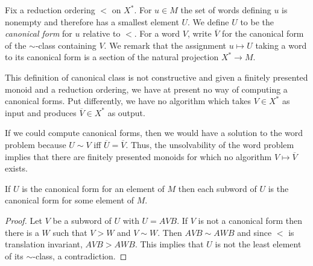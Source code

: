 \begin{defn} Fix a reduction ordering $<$ on $X^*$. For $u\in M$ the set of
    words defining $u$ is nonempty and therefore has a smallest element $U$. We
    define $U$ to be the \emph{canonical form} for $u$ relative to $<$. For a
    word $V$, write $\overline{V}$ for the canonical form of the $\sim$-class
    containing $V$. We remark that the assignment $u\mapsto U$ taking a word to
    its canonical form is a section of the natural projection $X^* \rightarrow
    M$.
\end{defn}

\begin{rem} This definition of canonical class is not constructive and given a
    finitely presented monoid and a reduction ordering, we have at present no
    way of computing a canonical forms. Put differently, we have no algorithm
    which takes $V\in X^*$ as input and produces $\overline{V}\in X^*$ as
    output.

    If we could compute canonical forms, then we would have a solution to the
    word problem because $U\sim V$ iff $\overline{U} = \overline{V}$. Thus, the
    unsolvability of the word problem implies that there are finitely presented
    monoids for which no algorithm $V\mapsto \overline{V}$ exists.
\end{rem}

\begin{prop} If $U$ is the canonical form for an element of $M$ then each
    subword of $U$ is the canonical form for some element of $M$.
\end{prop}
\begin{proof} Let $V$ be a subword of $U$ with $U = AVB$. If $V$ is not a
    canonical form then there is a $W$ such that $V > W$ and $V\sim W$. Then
    $AVB \sim AWB$ and since $<$ is translation invariant, $AVB > AWB$. This
    implies that $U$ is not the least element of its $\sim$-class, a
    contradiction.
\end{proof}

